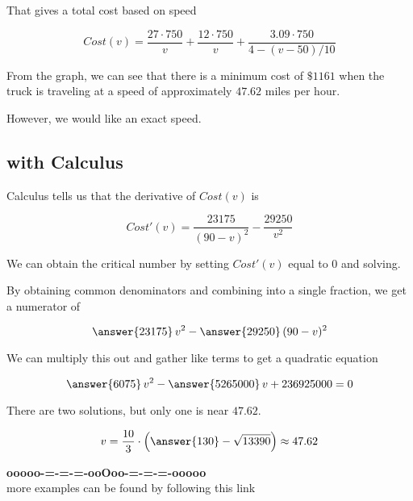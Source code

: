 \documentclass{ximera}
\begin{document}
That gives a total cost based on speed

\[
Cost(v) = \frac{27 \cdot 750}{v} + \frac{12 \cdot 750}{v} + \frac{3.09 \cdot 750}{4-(v-50)/10}
\]





\begin{center}
\end{center}



From the graph, we can see that there is a minimum cost of $\$1161$ when the truck is traveling at a speed of approximately $47.62$ miles per hour.




However, we would like an exact speed. \\






\subsection*{with Calculus}

Calculus tells us that the derivative of $Cost(v)$ is


\[
Cost'(v) = \frac{23175}{(90-v)^2} - \frac{29250}{v^2}
\]



We can obtain the critical number by setting $Cost'(v)$ equal to $0$ and solving.


\begin{explanation}
By obtaining common denominators and combining into a single fraction, we get a numerator of

\[
\answer{23175} \, v^2 - \answer{29250} \, (90-v)^2
\]


We can multiply this out and gather like terms to get a quadratic equation

\[
\answer{6075} \, v^2 - \answer{5265000} \, v + 236925000 = 0
\]



There are two solutions, but only one is near $47.62$.


\[
v = \frac{10}{3} \cdot \left( \answer{130} - \sqrt{13390} \right) \approx 47.62
\]


\end{explanation}











\begin{center}
\textbf{\textcolor{green!50!black}{ooooo-=-=-=-ooOoo-=-=-=-ooooo}} \\

more examples can be found by following this link\\ 

\end{center}
\end{document}
